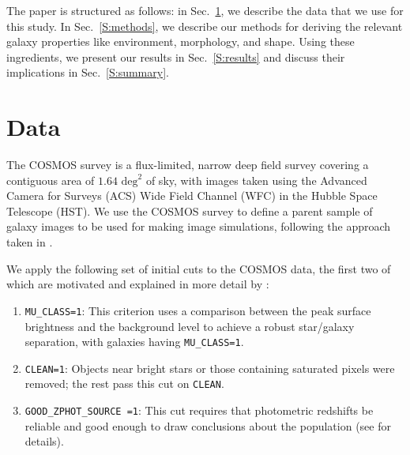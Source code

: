 \documentclass[twocolumn,useAMS,usenatbib]{mn2e}
\newcommand{\rachel}[1]{{\textcolor{red}{#1}}}
\newcommand{\arun}[1]{{\textcolor{blue}{#1}}}
\begin{document}
The paper is structured as follows: in Sec.~\ref{S:data}, we describe
the data that we use for this study.  In Sec.~\ref{S:methods}, we
describe our methods for deriving the relevant galaxy properties
like environment, morphology, and shape.  
Using these ingredients, we present our results in Sec.~\ref{S:results}
and discuss their implications in Sec.~\ref{S:summary}.
\section{Data}
\label{S:data}
The COSMOS survey \citep{COSMOS_overview, COSMOS_generic, COSMOS_Alexie} is a flux-limited, narrow deep field survey covering a contiguous area of $1.64 \text{ deg}^2$ of sky, with images taken using the Advanced Camera for Surveys (ACS) Wide Field Channel (WFC)
in the Hubble Space Telescope (HST).  We use the COSMOS survey to
define a parent sample of galaxy images to be used for making image
simulations, following the approach taken in
\cite{2012MNRAS.420.1518M,great3}.

We apply the following set of initial cuts to the COSMOS data, the
first two of which
are motivated and explained in more detail by \cite{COSMOS_Alexie}:
\begin{enumerate}
 \item \texttt{MU\_CLASS=1}: This criterion uses a comparison between
   the peak surface brightness and the background level to achieve a
   robust star/galaxy separation, with galaxies having \texttt{MU\_CLASS=1}. 
 \item \texttt{CLEAN=1}: Objects near bright stars or those containing
   saturated pixels were removed; the rest pass this cut on \texttt{CLEAN}. 
 \item \texttt{GOOD\_ZPHOT\_SOURCE =1}: This cut requires that
   photometric redshifts be reliable and good enough to draw
   conclusions about the population (see \citealt{2012MNRAS.420.1518M}
   for details).
\end{enumerate}
\end{document}
